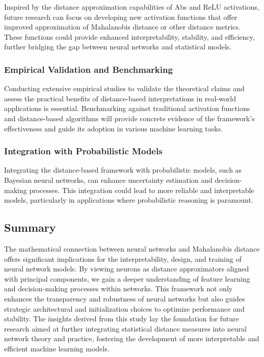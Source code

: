 Inspired by the distance approximation capabilities of Abs and ReLU activations, future research can focus on developing new activation functions that offer improved approximation of Mahalanobis distance or other distance metrics. These functions could provide enhanced interpretability, stability, and efficiency, further bridging the gap between neural networks and statistical models.

\subsubsection{Empirical Validation and Benchmarking}

Conducting extensive empirical studies to validate the theoretical claims and assess the practical benefits of distance-based interpretations in real-world applications is essential. Benchmarking against traditional activation functions and distance-based algorithms will provide concrete evidence of the framework's effectiveness and guide its adoption in various machine learning tasks.

\subsubsection{Integration with Probabilistic Models}

Integrating the distance-based framework with probabilistic models, such as Bayesian neural networks, can enhance uncertainty estimation and decision-making processes. This integration could lead to more reliable and interpretable models, particularly in applications where probabilistic reasoning is paramount.

\subsection{Summary}

The mathematical connection between neural networks and Mahalanobis distance offers significant implications for the interpretability, design, and training of neural network models. By viewing neurons as distance approximators aligned with principal components, we gain a deeper understanding of feature learning and decision-making processes within networks. This framework not only enhances the transparency and robustness of neural networks but also guides strategic architectural and initialization choices to optimize performance and stability. The insights derived from this study lay the foundation for future research aimed at further integrating statistical distance measures into neural network theory and practice, fostering the development of more interpretable and efficient machine learning models.
